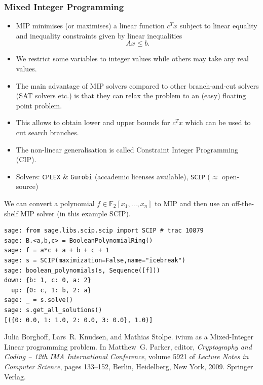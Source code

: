 \documentclass[9pt]{beamer}
\newcommand{\field}[1]{\ensuremath{\mathbb{#1}}}
\begin{document}
\begin{frame}
\frametitle{Mixed Integer Programming} 

\begin{itemize}
 \item MIP minimises (or maximises) a linear function $c^T x$ subject to linear equality and inequality constraints given by linear inequalities $$Ax ≤ b.$$
 \item We restrict some variables to integer values while others may take any real values.
 \item The main advantage of MIP solvers compared to other branch-and-cut solvers (SAT solvers etc.) is that they can relax the problem to an (easy) floating point problem.
 \item This allows to obtain lower and upper bounds for $c^T x$ which can be used to cut search branches.
 \item The non-linear generalisation is called Constraint Integer Programming (CIP).
 \item Solvers: {\tt CPLEX} \& {\tt Gurobi} (accademic licenses available), {\tt SCIP} ($\approx$ open-source)
\end{itemize}


\framebreak
 
We can convert a polynomial $f \in \field{F}_2[x_1,\dots,x_{n}]$ to MIP and then use an off-the-shelf MIP solver (in this example SCIP).

\begin{lstlisting}
sage: from sage.libs.scip.scip import SCIP # trac 10879
sage: B.<a,b,c> = BooleanPolynomialRing()
sage: f = a*c + a + b + c + 1
sage: s = SCIP(maximization=False,name="icebreak")
sage: boolean_polynomials(s, Sequence([f]))
down: {b: 1, c: 0, a: 2}
  up: {0: c, 1: b, 2: a}
sage: _ = s.solve()
sage: s.get_all_solutions()
[({0: 0.0, 1: 1.0, 2: 0.0, 3: 0.0}, 1.0)]
\end{lstlisting}

\begin{small}
\begin{thebibliography}{biviummip}
Julia Borghoff, Lars~R. Knudsen, and Mathias Stolpe.
ivium as a {M}ixed-{I}nteger {L}inear programming problem.
\newblock In Matthew~G. Parker, editor, {\em Cryptography and Coding -- 12th
  IMA International Conference}, volume 5921 of {\em Lecture Notes in Computer
  Science}, pages 133--152, Berlin, Heidelberg, New York, 2009. Springer
  Verlag.
\end{thebibliography}
\end{small}
\end{frame}
\end{document}
